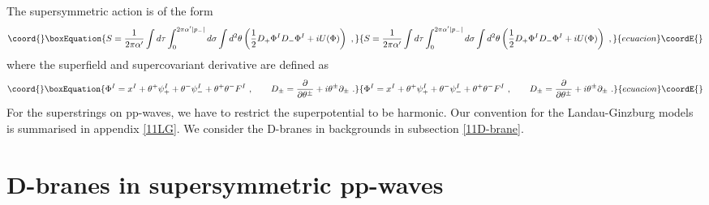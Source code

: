 \documentclass[a4paper,12pt]{article}
\numberwithin{equation}{section}
\providecommand{\del}{\partial}
\providecommand{\Ncal}{{\cal N}}
\providecommand{\ta}{\theta}
\providecommand{\deldel}[2]{\frac{\del #1}{\del #2}}
\begin{document}
The \coordHE{} supersymmetric action is of the form
\begin{equation}\coord{}\boxEquation{
 S = \frac{1}{2 \pi \alpha'} \int d \tau \int _0 ^{2\pi \alpha'|p_-|}
   d \sigma \int d^2 \theta \left(
        \frac12 D_{+} \Phi^{I} D_{-} \Phi^{I} + i U(\Phi)
   \right) ~,
 \label{N=1action}
}{
 S = \frac{1}{2 \pi \alpha'} \int d \tau \int _0 ^{2\pi \alpha'|p_-|}
   d \sigma \int d^2 \theta \left(
        \frac12 D_{+} \Phi^{I} D_{-} \Phi^{I} + i U(\Phi)
   \right) ~,
 }{ecuacion}\coordE{}\end{equation}
where the \coordHE{} superfield \coordHE{} and supercovariant derivative
\coordHE{} are defined as
\begin{equation}\coord{}\boxEquation{
 \Phi^{I}=x^{I}+\ta^{+}\psi_{+}^{I} 
 + \ta^{-}\psi_{-}^{I} +  \ta^{+}\ta^{-}F^I ~,
\qquad 
 D_{\pm}=\deldel{}{\ta^{\pm}}+i\ta^{\pm}\del_{\pm} ~.
}{
 \Phi^{I}=x^{I}+\ta^{+}\psi_{+}^{I} 
 + \ta^{-}\psi_{-}^{I} +  \ta^{+}\ta^{-}F^I ~,
\qquad 
 D_{\pm}=\deldel{}{\ta^{\pm}}+i\ta^{\pm}\del_{\pm} ~.
}{ecuacion}\coordE{}\end{equation}
For the superstrings on pp-waves,
we have to restrict the superpotential to be harmonic. 
Our convention for the \myHighlight{$\Ncal=(1,1)$}\coordHE{} Landau-Ginzburg models is summarised
in appendix \ref{11LG}. We consider the D-branes in \myHighlight{$\Ncal=(1,1)$}\coordHE{} backgrounds
in subsection \ref{11D-brane}.


\section{D-branes in supersymmetric pp-waves}
\label{section-D-branes}
\end{document}
